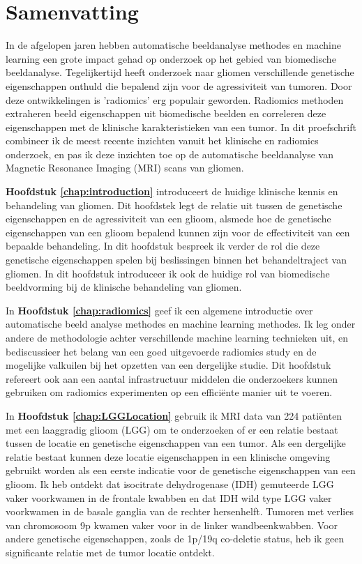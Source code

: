 \chapter{Samenvatting}
\begin{ChapterAbstractNoTitle}
\end{ChapterAbstractNoTitle}

In de afgelopen jaren hebben automatische beeldanalyse methodes en machine learning een grote impact gehad op onderzoek op het gebied van biomedische beeldanalyse.
Tegelijkertijd heeft onderzoek naar gliomen verschillende genetische eigenschappen onthuld die bepalend zijn voor de agressiviteit van tumoren.
Door deze ontwikkelingen is 'radiomics' erg populair geworden.
Radiomics methoden extraheren beeld eigenschappen uit biomedische beelden en correleren deze eigenschappen met de klinische karakteristieken van een tumor.
In dit proefschrift combineer ik de meest recente inzichten vanuit het klinische en radiomics onderzoek, en pas ik deze inzichten toe op de automatische beeldanalyse van Magnetic Resonance Imaging (MRI) scans van gliomen.


\textbf{Hoofdstuk \ref{chap:introduction}} introduceert de huidige klinische kennis en behandeling van gliomen.
Dit hoofdstek legt de relatie uit tussen de genetische eigenschappen en de agressiviteit van een glioom, alsmede hoe de genetische eigenschappen van een glioom bepalend kunnen zijn voor de effectiviteit van een bepaalde behandeling.
In dit hoofdstuk bespreek ik verder de rol die deze genetische eigenschappen spelen bij beslissingen binnen het behandeltraject van gliomen.
In dit hoofdstuk introduceer ik ook de huidige rol van biomedische beeldvorming bij de klinische behandeling van gliomen.

In \textbf{Hoofdstuk \ref{chap:radiomics}} geef ik een algemene introductie over automatische beeld analyse methodes en machine learning methodes.
Ik leg onder andere de methodologie achter verschillende machine learning technieken uit, en bediscussieer het belang van een goed uitgevoerde radiomics study en de mogelijke valkuilen bij het opzetten van een dergelijke studie.
Dit hoofdstuk refereert ook aan een aantal infrastructuur middelen die onderzoekers kunnen gebruiken om radiomics experimenten op een effici{\"e}nte manier uit te voeren.

In \textbf{Hoofdstuk \ref{chap:LGGLocation}} gebruik ik MRI data van 224 pati{\"e}nten met een  laaggradig glioom (LGG) om te onderzoeken of er een relatie bestaat tussen de locatie en genetische eigenschappen van een tumor.
Als een dergelijke relatie bestaat kunnen deze locatie eigenschappen in een klinische omgeving gebruikt worden als een eerste indicatie voor de genetische eigenschappen van een glioom.
Ik heb ontdekt dat isocitrate dehydrogenase (IDH) gemuteerde LGG vaker voorkwamen in de frontale kwabben en dat IDH wild type LGG vaker voorkwamen in de basale ganglia van de rechter hersenhelft.
Tumoren met verlies van chromosoom 9p kwamen vaker voor in de linker wandbeenkwabben.
Voor andere genetische eigenschappen, zoals de 1p/19q co-deletie status, heb ik geen significante relatie met de tumor locatie ontdekt.

